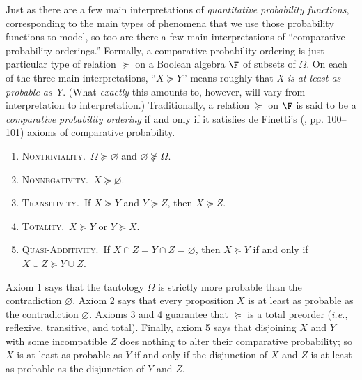 Just as there are a few main interpretations of \emph{quantitative probability functions}, corresponding to the main types of phenomena that we use those probability functions to model, so too are there a few main interpretations of ``comparative probability orderings.'' Formally, a comparative probability ordering is just particular type of relation $\succeq$ on a Boolean algebra $\F$ of subsets of $\Omega$. On each of the three main interpretations, ``$X\succeq Y$'' means roughly that \emph{X is at least as probable as Y}. (What \emph{exactly} this amounts to, however, will vary from interpretation to interpretation.) Traditionally, a relation $\succeq$ on $\F$ is said to be a \emph{comparative probability ordering} if and only if it satisfies de Finetti's (, pp. 100--101) axioms of comparative probability.
\begin{enumerate}
\item \textsc{Nontriviality}.\, $\Omega\succeq \varnothing$ and $\varnothing\not\succeq \Omega$.
\item \textsc{Nonnegativity}.\, $X\succeq \varnothing$.
\item \textsc{Transitivity}.\, If $X\succeq Y$ and $Y\succeq Z$, then $X\succeq Z$.
\item \textsc{Totality}.\, $X\succeq Y$ or $Y\succeq X$.
\item \textsc{Quasi-Additivity}.\, If $X\cap Z=Y\cap Z=\varnothing$, then $X\succeq Y$ if and only if $X\cup Z\succeq Y\cup Z$.
\end{enumerate}
Axiom 1 says that the tautology $\Omega$ is strictly more probable than the contradiction $\varnothing$. Axiom 2 says that every proposition $X$ is at least as probable as the contradiction $\varnothing$. Axioms 3 and 4 guarantee that $\succeq$ is a total preorder (\textit{i.e.}, reflexive, transitive, and total). Finally, axiom 5 says that disjoining $X$ and $Y$ with some incompatible $Z$ does nothing to alter their comparative probability; so $X$ is at least as probable as $Y$ if and only if the disjunction of $X$ and $Z$ is at least as probable as the disjunction of $Y$ and $Z$.


